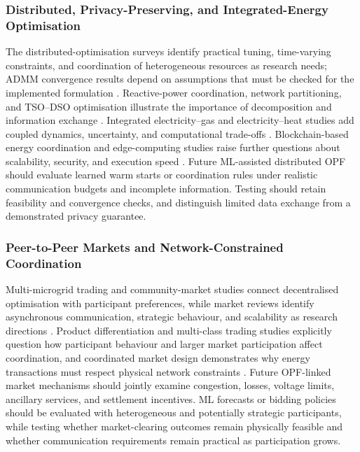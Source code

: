 \documentclass[a4paper,fleqn]{cas-sc}
\begin{document}
    \subsubsection{Distributed, Privacy-Preserving, and Integrated-Energy Optimisation}\label{subsubsec:gaps_distributed}
    
    The distributed-optimisation surveys identify practical tuning, time-varying constraints, and coordination of heterogeneous resources as research needs; ADMM convergence results depend on assumptions that must be checked for the implemented formulation \cite{opfRef001,opfRef050,opfRef044}. Reactive-power coordination, network partitioning, and TSO--DSO optimisation illustrate the importance of decomposition and information exchange \cite{opfRef025,opfRef046,opfRef043}. Integrated electricity--gas and electricity--heat studies add coupled dynamics, uncertainty, and computational trade-offs \cite{opfRef039,opfRef042,opfRef086}. Blockchain-based energy coordination and edge-computing studies raise further questions about scalability, security, and execution speed \cite{opfRef033,opfRef054,opfRef065,opfRef081}. Future ML-assisted distributed OPF should evaluate learned warm starts or coordination rules under realistic communication budgets and incomplete information. Testing should retain feasibility and convergence checks, and distinguish limited data exchange from a demonstrated privacy guarantee.
    
    \subsubsection{Peer-to-Peer Markets and Network-Constrained Coordination}\label{subsubsec:gaps_markets}
    
    Multi-microgrid trading and community-market studies connect decentralised optimisation with participant preferences, while market reviews identify asynchronous communication, strategic behaviour, and scalability as research directions \cite{opfRef024,sousa2019peer,opfRef087}. Product differentiation and multi-class trading studies explicitly question how participant behaviour and larger market participation affect coordination, and coordinated market design demonstrates why energy transactions must respect physical network constraints \cite{opfRef052,opfRef058,opfRef066}. Future OPF-linked market mechanisms should jointly examine congestion, losses, voltage limits, ancillary services, and settlement incentives. ML forecasts or bidding policies should be evaluated with heterogeneous and potentially strategic participants, while testing whether market-clearing outcomes remain physically feasible and whether communication requirements remain practical as participation grows.
    
\end{document}
